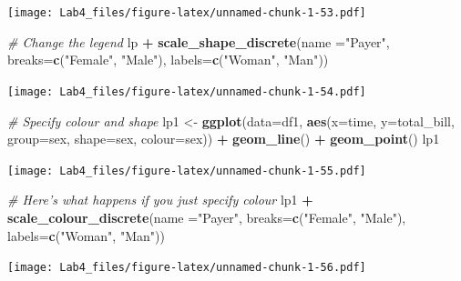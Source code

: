\documentclass[]{article}
\newenvironment{Shaded}{\begin{snugshade}}{\end{snugshade}}
\newcommand{\KeywordTok}[1]{\textcolor[rgb]{0.13,0.29,0.53}{\textbf{#1}}}
\newcommand{\DataTypeTok}[1]{\textcolor[rgb]{0.13,0.29,0.53}{#1}}
\newcommand{\StringTok}[1]{\textcolor[rgb]{0.31,0.60,0.02}{#1}}
\newcommand{\CommentTok}[1]{\textcolor[rgb]{0.56,0.35,0.01}{\textit{#1}}}
\newcommand{\OperatorTok}[1]{\textcolor[rgb]{0.81,0.36,0.00}{\textbf{#1}}}
\newcommand{\NormalTok}[1]{#1}
\begin{document}
\texttt{[image: Lab4\_files/figure-latex/unnamed-chunk-1-53.pdf]}

\begin{Shaded}
\begin{Highlighting}[]
\CommentTok{# Change the legend}
\NormalTok{lp }\OperatorTok{+}\StringTok{ }\KeywordTok{scale_shape_discrete}\NormalTok{(}\DataTypeTok{name  =}\StringTok{"Payer"}\NormalTok{,}
                          \DataTypeTok{breaks=}\KeywordTok{c}\NormalTok{(}\StringTok{"Female"}\NormalTok{, }\StringTok{"Male"}\NormalTok{),}
                          \DataTypeTok{labels=}\KeywordTok{c}\NormalTok{(}\StringTok{"Woman"}\NormalTok{, }\StringTok{"Man"}\NormalTok{))}
\end{Highlighting}
\end{Shaded}

\texttt{[image: Lab4\_files/figure-latex/unnamed-chunk-1-54.pdf]}

\begin{Shaded}
\begin{Highlighting}[]
\CommentTok{# Specify colour and shape}
\NormalTok{lp1 <-}\StringTok{ }\KeywordTok{ggplot}\NormalTok{(}\DataTypeTok{data=}\NormalTok{df1, }\KeywordTok{aes}\NormalTok{(}\DataTypeTok{x=}\NormalTok{time, }\DataTypeTok{y=}\NormalTok{total_bill, }\DataTypeTok{group=}\NormalTok{sex, }\DataTypeTok{shape=}\NormalTok{sex, }\DataTypeTok{colour=}\NormalTok{sex)) }\OperatorTok{+}\StringTok{ }\KeywordTok{geom_line}\NormalTok{() }\OperatorTok{+}\StringTok{ }\KeywordTok{geom_point}\NormalTok{()}
\NormalTok{lp1}
\end{Highlighting}
\end{Shaded}

\texttt{[image: Lab4\_files/figure-latex/unnamed-chunk-1-55.pdf]}

\begin{Shaded}
\begin{Highlighting}[]
\CommentTok{# Here's what happens if you just specify colour}
\NormalTok{lp1 }\OperatorTok{+}\StringTok{ }\KeywordTok{scale_colour_discrete}\NormalTok{(}\DataTypeTok{name  =}\StringTok{"Payer"}\NormalTok{,}
                            \DataTypeTok{breaks=}\KeywordTok{c}\NormalTok{(}\StringTok{"Female"}\NormalTok{, }\StringTok{"Male"}\NormalTok{),}
                            \DataTypeTok{labels=}\KeywordTok{c}\NormalTok{(}\StringTok{"Woman"}\NormalTok{, }\StringTok{"Man"}\NormalTok{))}
\end{Highlighting}
\end{Shaded}

\texttt{[image: Lab4\_files/figure-latex/unnamed-chunk-1-56.pdf]}
\end{document}
